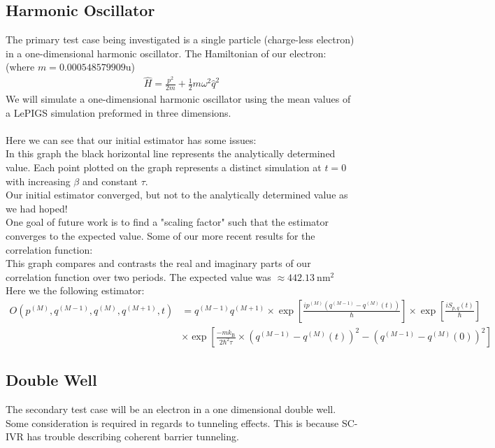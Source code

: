 \documentclass[12pt,letterpaper,oneside,final,titlepage]{article}               %
\numberwithin{equation}{section} %
\newcommand{\expb}[1]{\ensuremath{\exp{\left[ #1 \right]}}}
\begin{document}
\subsection*{Harmonic Oscillator}
The primary test case being investigated is a single particle (charge-less electron) in a one-dimensional harmonic oscillator. 
The Hamiltonian of our electron: (where $m = \num{0.000548579909}$u)
\begin{align}
    \hat{H} = \frac{p^2}{2m} + \frac{1}{2} m \omega^{2} \hat{q}^{2} 
\end{align}
We will simulate a one-dimensional harmonic oscillator using the mean values of a LePIGS simulation preformed in three dimensions. \\ \\
Here we can see that our initial estimator has some issues:\\
In this graph the black horizontal line represents the analytically determined value.
Each point plotted on the graph represents a distinct simulation at $t=0$ with increasing $\beta$ and constant $\tau$.\\
Our initial estimator converged, but not to the analytically determined value as we had hoped! \\
One goal of future work is to find a "scaling factor" such that the estimator converges to the expected value.
Some of our more recent results for the correlation function:\\
This graph compares and contrasts the real and imaginary parts of our correlation function over two periods. 
The expected value was $\approx 442.13~\textrm{nm}^2$ \\
Here we the following estimator:
\newcommand{\bead}[1]{^{(#1)}}
\newcommand{\kB}{k_\textrm{B}}
\begin{align*}
    O(p\bead{M}, q\bead{M-1}, q\bead{M}, q\bead{M+1}, t) 
        &= q\bead{M-1} q\bead{M+1}
        \times\expb{\frac{ip\bead{M}(q\bead{M-1} - q\bead{M}(t))}{\hbar}} 
        \times\expb{\frac{iS_{p,q}(t)}{\hbar}}
    \\  &\times\expb{\frac{-m\kB}{2\hbar^{2}\tau} \times(q\bead{M-1} - q\bead{M}(t))^{2} - (q\bead{M-1} - q\bead{M}(0))^{2}}
\end{align*} 

\subsection*{Double Well}
The secondary test case will be an electron in a one dimensional double well. 
Some consideration is required in regards to tunneling effects. 
This is because SC-IVR has trouble describing coherent barrier tunneling.
\end{document}

